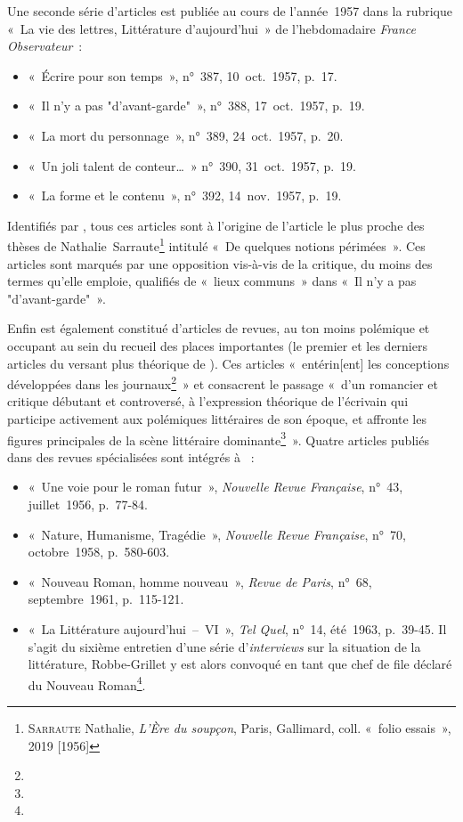 Une seconde série d'articles est publiée au cours de l'année~1957 dans la rubrique «~La vie des lettres, Littérature d’aujourd’hui~» de l'hebdomadaire \textit{France Observateur}~:
\begin{itemize}
    \item «~Écrire pour son temps~», n°~387, 10~oct.~1957, p.~17.
    \item «~Il n’y a pas "d’avant-garde"~», n°~388, 17~oct.~1957, p.~19.
    \item «~La mort du personnage~», n°~389, 24~oct.~1957, p.~20.
    \item «~Un joli talent de conteur…~» n°~390, 31~oct.~1957, p.~19.
    \item «~La forme et le contenu~», n°~392, 14~nov.~1957, p.~19.
\end{itemize}
Identifiés par \galia, tous ces articles sont à l'origine de l'article le plus proche des thèses de Nathalie~Sarraute\footnote{\textsc{Sarraute} Nathalie, \textit{L'Ère du soupçon}, Paris, Gallimard, coll. «~folio essais~», 2019 [1956]} intitulé «~De quelques notions périmées~». Ces articles sont marqués par une opposition vis-à-vis de la critique, du moins des termes qu'elle emploie, qualifiés de «~lieux communs~» dans «~Il n’y a pas "d’avant-garde"~».

Enfin \punr{} est également constitué d'articles de revues, au ton moins polémique et occupant au sein du recueil des places importantes (le premier et les derniers articles du versant plus théorique de \punr). Ces articles «~entérin[ent] les conceptions développées dans les journaux\footnote{}~» et consacrent le passage «~d’un romancier et critique débutant et controversé, à l’expression théorique de l’écrivain qui participe activement aux polémiques littéraires de son époque, et affronte les figures principales de la scène littéraire dominante\footnote{}~». Quatre articles publiés dans des revues spécialisées sont intégrés à \punr~:
\begin{itemize}
    \item «~Une voie pour le roman futur~», \textit{Nouvelle Revue Française}, n°~43, juillet~1956, p.~77-84.
    \item «~Nature, Humanisme, Tragédie~», \textit{Nouvelle Revue Française}, n°~70, octobre~1958, p.~580-603.
    \item «~Nouveau Roman, homme nouveau~», \textit{Revue de Paris}, n°~68, septembre~1961, p.~115-121.
    \item «~La Littérature aujourd'hui~–~VI~», \textit{Tel Quel}, n°~14, été~1963, p.~39-45. Il s'agit du sixième entretien d'une série d'\textit{interviews} sur la situation de la littérature, Robbe-Grillet y est alors convoqué en tant que chef de file déclaré du Nouveau Roman\footnote{}.
\end{itemize}


